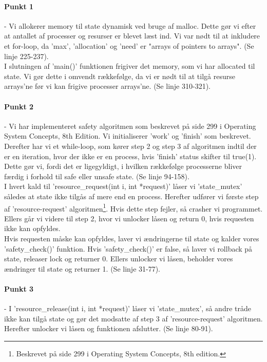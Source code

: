 \paragraph{Punkt 1} - Vi allokerer memory til state dynamisk ved bruge af malloc. Dette gør vi efter at antallet af processer og resurser er blevet læst ind. Vi var nødt til at inkludere et for-loop, da 'max', 'allocation' og 'need' er "arrays of pointers to arrays".  (Se linje 225-237).
\\I slutningen af 'main()' funktionen frigiver det memory, som vi har allocated til state. Vi gør dette i omvendt rækkefølge, da vi er nødt til at tilgå resurse arrays'ne før vi kan frigive processer arrays'ne. (Se linje 310-321).
\paragraph{Punkt 2} - Vi har implementeret safety algoritmen som beskrevet på side 299 i Operating System Concepts, 8th Edition. Vi initialiserer 'work' og 'finish' som beskrevet. Derefter har vi et while-loop, som kører step 2 og step 3 af algoritmen indtil der er en iteration, hvor der ikke er en process, hvis 'finish' status skifter til true(1). Dette gør vi, fordi det er ligegyldigt, i hvilken rækkefølge processerne bliver færdig i forhold til safe eller unsafe state. (Se linje 94-158).
\\I hvert kald til 'resource\_request(int i, int *request)' låser vi 'state\_mutex' således at state ikke tilgås af mere end en process. Herefter udfører vi første step af 'resource-request' algoritmen\footnote{Beskrevet på side 299 i Operating System Concepts, 8th edition.}. Hvis dette step fejler, så crasher vi programmet. Ellers går vi videre til step 2, hvor vi unlocker låsen og return 0, hvis requesten ikke kan opfyldes. 
\\Hvis requesten måske kan opfyldes, laver vi ændringerne til state og kalder vores 'safety\_check()' funktion. Hvis 'safety\_check()' er false, så laver vi rollback på state, releaser lock og returner 0. Ellers unlocker vi låsen, beholder vores ændringer til state og returner 1. (Se linje 31-77).
\paragraph{Punkt 3} - I 'resource\_release(int i, int *request)'  låser vi 'state\_mutex', så andre tråde ikke kan tilgå state og gør det modsatte af step 3 af 'resource-request' algoritmen. Herefter unlocker vi låsen og funktionen afslutter. (Se linje 80-91).
